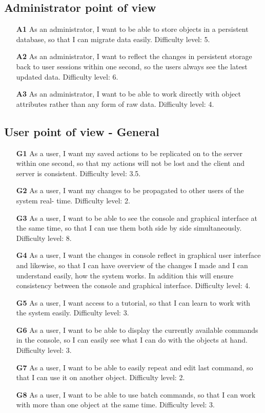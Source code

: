 \subsection*{Administrator point of view}
\begin{itemize}
  \item [\textbf{A1}] As an administrator, I want to be able to store objects in a persistent database, so that I can migrate data easily. Difficulty level: 5.
  \item [\textbf{A2}] As an administrator, I want to reflect the changes in persistent storage back to user sessions within one second, so the users always see the latest updated data. Difficulty level: 6.
  \item [\textbf{A3}] As an administrator, I want to be able to work directly with object attributes rather than any form of raw data. Difficulty level: 4.
\end{itemize}

\subsection*{User point of view - General}
\begin{itemize}
  \item [\textbf{G1}] As a user, I want my saved actions to be replicated on to the server within one second, so that my actions will not be lost and the client and server is consistent. Difficulty level: 3.5.
  \item [\textbf{G2}] As a user, I want my changes to be propagated to other users of the system real- time. Difficulty level: 2.
  \item [\textbf{G3}] As a user, I want to be able to see the console and graphical interface at the same time, so that I can use them both side by side simultaneously. Difficulty level: 8.
  \item [\textbf{G4}] As a user, I want the changes in console reflect in graphical user interface and likewise, so that I can have overview of the changes I made and I can understand easily, how the system works. In addition this will ensure consistency between the console and graphical interface. Difficulty level: 4.
  \item [\textbf{G5}] As a user, I want access to a tutorial, so that I can learn to work with the system easily. Difficulty level: 3.
  \item [\textbf{G6}] As a user, I want to be able to display the currently available commands in the console, so I can easily see what I can do with the objects at hand. Difficulty level: 3.
  \item [\textbf{G7}] As a user, I want to be able to easily repeat and edit last command, so that I can use it on another object. Difficulty level: 2.
  \item [\textbf{G8}] As a user, I want to be able to use batch commands, so that I can work with more than one object at the same time. Difficulty level: 3.
\end{itemize}

